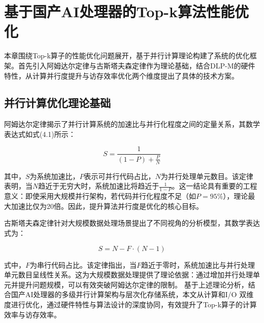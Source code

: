 \chapter{基于国产AI处理器的Top-k算法性能优化}


本章围绕Top-k算子的性能优化问题展开，基于并行计算理论构建了系统的优化框架。首先引入阿姆达尔定律与古斯塔夫森定律作为理论基础，结合DLP-M的硬件特性，从计算并行度提升与访存效率优化两个维度提出了具体的技术方案。

\section{并行计算优化理论基础}

阿姆达尔定律揭示了并行计算系统的加速比与并行化程度之间的定量关系，其数学表达式如式(4.1)所示：

\begin{equation}
S = \frac{1}{(1-P) + \frac{P}{N}}
\label{eq:4.1}
\end{equation}

其中，$S$为系统加速比，$P$表示可并行代码占比，$N$为并行处理单元数目。该定律表明，当$N$趋近于无穷大时，系统加速比将趋近于$\frac{1}{1-P}$。这一结论具有重要的工程意义：即使采用大规模并行架构，若代码并行化程度不足（如$P=95\%$），理论最大加速比仅为20倍。因此，提升算法并行度是优化的核心目标。

古斯塔夫森定律针对大规模数据处理场景提出了不同视角的分析模型，其数学表达式为：

\begin{equation}
S = N - F \cdot (N - 1)
\label{eq:4.3}
\end{equation}

式中，$F$为串行代码占比。该定律指出，当$F$趋近于零时，系统加速比与并行处理单元数目呈线性关系。这为大规模数据处理提供了理论依据：通过增加并行处理单元并提升问题规模，可以有效突破阿姆达尔定律的限制。
基于上述理论分析，结合国产AI处理器的多级并行计算架构与层次化存储系统，本文从计算和I/O 双维度进行优化，通过硬件特性与算法设计的深度协同，有效提升了Top-k算子的计算效率与访存效率。


